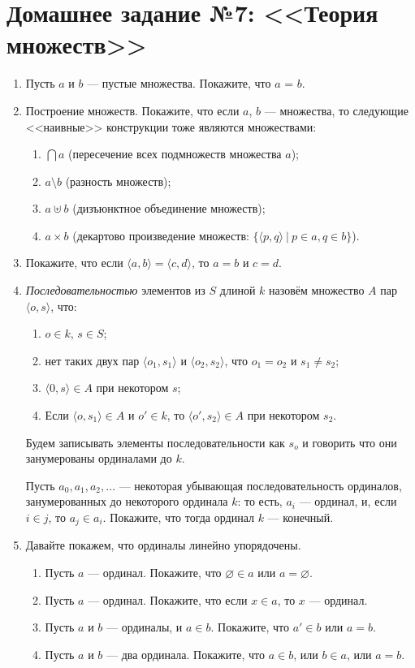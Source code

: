 \documentclass[10pt,a4paper,oneside]{article}
\begin{document}
\section*{Домашнее задание №7: <<Теория множеств>>}

\begin{enumerate}
\item Пусть $a$ и $b$ --- пустые множества. Покажите, что $a$ = $b$.

\item Построение множеств. Покажите, что если $a$, $b$ --- множества, то следующие <<наивные>>
конструкции тоже являются множествами:
\begin{enumerate}
\item $\bigcap a$ (пересечение всех подмножеств множества $a$);
\item $a \setminus b$ (разность множеств);
\item $a \uplus b$ (дизъюнктное объединение множеств);
\item $a \times b$ (декартово произведение множеств: $\{\langle p,q\rangle\ |\ p\in a, q\in b\}$).
\end{enumerate}

\item Покажите, что если $\langle a,b \rangle = \langle c,d\rangle$, то $a=b$ и $c=d$.

\item \emph{Последовательностью} элементов из $S$ длиной $k$ назовём 
множество $A$ пар $\langle o, s\rangle$, что:
\begin{enumerate}
\item $o\in k$, $s \in S$;
\item нет таких двух пар $\langle o_1, s_1\rangle$ и $\langle o_2, s_2\rangle$, что $o_1 = o_2$ и $s_1 \ne s_2$;
\item $\langle 0, s\rangle \in A$ при некотором $s$;
\item Если $\langle o, s_1 \rangle \in A$ и $o' \in k$, то $\langle o', s_2 \rangle \in A$ при некотором $s_2$.
\end{enumerate}
Будем записывать элементы последовательности как $s_o$ и говорить что
они занумерованы ординалами до $k$.

Пусть $a_0, a_1, a_2, \dots$ --- некоторая убывающая последовательность ординалов,
занумерованных до некоторого ординала $k$:
то есть, $a_i$ --- ординал, и, если $i \in j$, то $a_j \in a_i$. 
Покажите, что тогда ординал $k$ --- конечный.

\item Давайте покажем, что ординалы линейно упорядочены.
\begin{enumerate}
\item Пусть $a$ --- ординал. Покажите, что $\varnothing \in a$ или $a = \varnothing$.
\item Пусть $a$ --- ординал. Покажите, что если $x \in a$, то $x$ --- ординал.
\item Пусть $a$ и $b$ --- ординалы, и $a \in b$. Покажите, что $a' \in b$ или $a = b$.
\item Пусть $a$ и $b$ --- два ординала. Покажите, что $a\in b$, или $b \in a$, или $a = b$.
\end{enumerate}


\end{enumerate}
\end{document}
